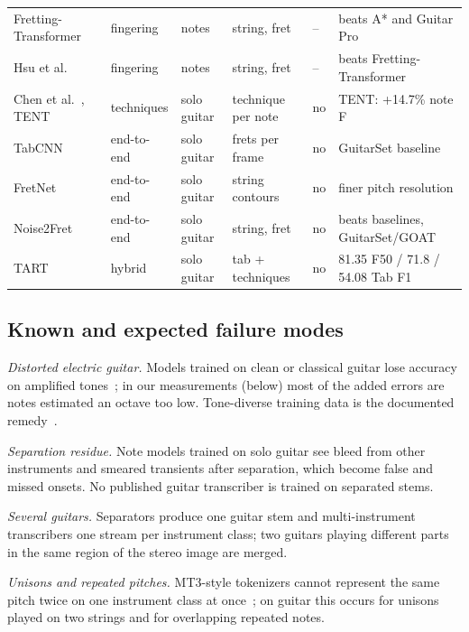 \begin{table}[t]
\begin{tabular}{@{}llllll@{}}
Fretting-Transformer~\cite{hamberger2025fretting} & fingering & notes & string, fret & -- & beats A* and Guitar Pro \\
Hsu et al.~\cite{hsu2026noteevent} & fingering & notes & string, fret & -- & beats Fretting-Transformer \\
Chen et al.~\cite{chen2015technique}, TENT~\cite{su2019tent} & techniques & solo guitar & technique per note & no & TENT: +14.7\% note F \\
TabCNN~\cite{wiggins2019tabcnn} & end-to-end & solo guitar & frets per frame & no & GuitarSet baseline \\
FretNet~\cite{cwitkowitz2023fretnet} & end-to-end & solo guitar & string contours & no & finer pitch resolution \\
Noise2Fret~\cite{simionato2026noise2fret} & end-to-end & solo guitar & string, fret & no & beats baselines, GuitarSet/GOAT \\
TART~\cite{gupta2026tart} & hybrid & solo guitar & tab + techniques & no & 81.35 F50 / 71.8 / 54.08 Tab F1 \\
\bottomrule
\end{tabular}
\end{table}

\subsection{Known and expected failure modes}
\emph{Distorted electric guitar.} Models trained on clean or classical guitar
lose accuracy on amplified tones~\cite{chen2022egdb}; in our measurements
(below) most of the added errors are notes estimated an octave too low.
Tone-diverse training data is the documented
remedy~\cite{chen2025egdbpg,pedroza2024tones}.

\emph{Separation residue.} Note models trained on solo guitar see bleed from
other instruments and smeared transients after separation, which become
false and missed onsets. No published guitar transcriber is trained on
separated stems.

\emph{Several guitars.} Separators produce one guitar stem and
multi-instrument transcribers one stream per instrument class; two guitars
playing different parts in the same region of the stereo image are merged.

\emph{Unisons and repeated pitches.} MT3-style tokenizers cannot represent the
same pitch twice on one instrument class at once~\cite{rouard2026muscriptor};
on guitar this occurs for unisons played on two strings and for overlapping
repeated notes.


